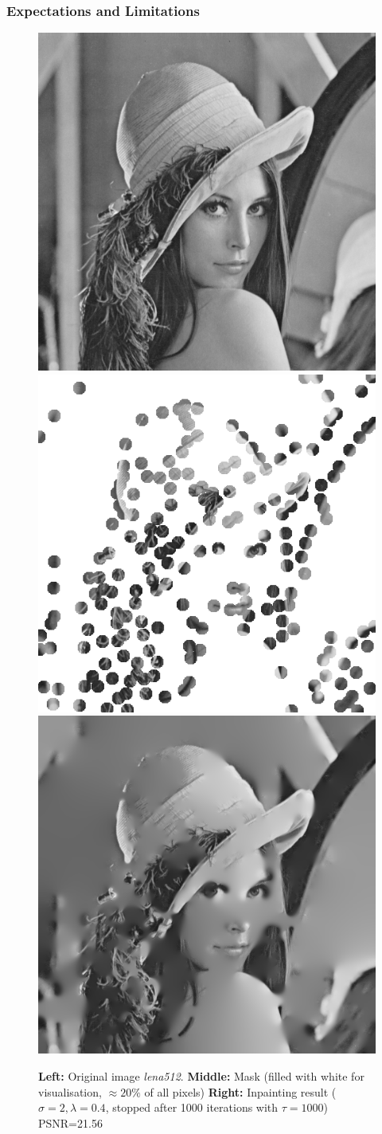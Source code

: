 \documentclass{beamer}
\begin{document}
    \begin{frame}
        \frametitle{Expectations and Limitations}
        \begin{figure}
             \centering
             \includegraphics[width=0.3\linewidth]{../images/grey/lena512.png}
             \includegraphics[width=0.3\linewidth]{../thesis/Images/lena512-mask.png}
             \includegraphics[width=0.3\linewidth]{../thesis/Images/lena512-inpaint.png}
             \caption{\textbf{Left:} Original image \textit{lena512}. \textbf{Middle:} Mask (filled
                 with white for visualisation, $\approx20\%$ of all pixels) \textbf{Right:} Inpainting result
             ($\sigma=2,\lambda=0.4$, stopped after 1000 iterations with $\tau=1000$) PSNR=21.56}
        \end{figure}    
    \end{frame}
\end{document}
